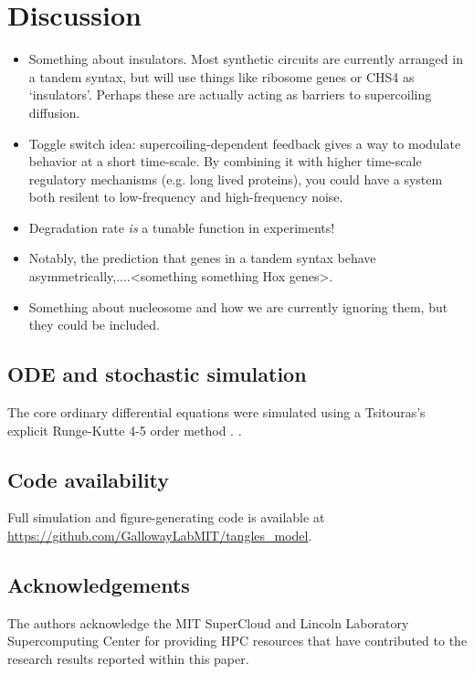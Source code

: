 \documentclass[11pt]{article}
\begin{document}
\FloatBarrier
\section{Discussion}

\begin{itemize}
    \item Something about insulators. Most synthetic circuits are currently arranged in a tandem syntax, but will use things like ribosome genes or CHS4 as `insulators'. Perhaps these are actually acting as barriers to supercoiling diffusion.
    \item Toggle switch idea: supercoiling-dependent feedback gives a way to modulate behavior at a short time-scale. By combining it with higher time-scale regulatory mechanisms (e.g. long lived proteins), you could have a system both resilent to low-frequency and high-frequency noise.
    \item Degradation rate \emph{is} a tunable function in experiments!
    \item Notably, the prediction that genes in a tandem syntax behave asymmetrically,....<something something Hox genes>.
    \item Something about nucleosome and how we are currently ignoring them, but they could be included.
\end{itemize}

\subsection{ODE and stochastic simulation}
The core ordinary differential equations were simulated using a Tsitouras's explicit Runge-Kutte 4-5 order method \parencite{tsitourasRungeKuttaPairs2011}.
\parencite{rackauckasDifferentialEquationsJlPerformant2017}.

\subsection{Code availability}
Full simulation and figure-generating code is available at \url{https://github.com/GallowayLabMIT/tangles_model}.

\subsection{Acknowledgements}
The authors acknowledge the MIT SuperCloud and Lincoln Laboratory Supercomputing Center \parencite{reutherInteractiveSupercomputing402018} for providing HPC resources that have contributed to the research results reported within this paper.
\end{document}
